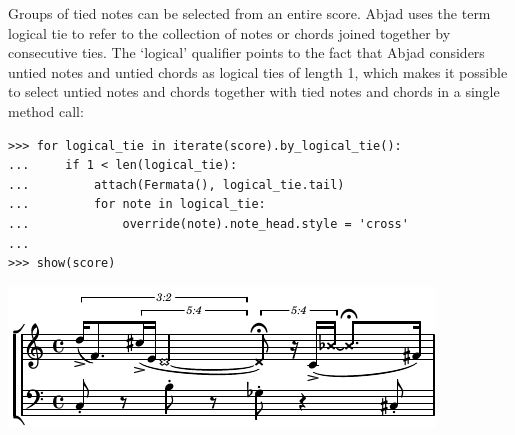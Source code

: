\documentclass{article}
\begin{document}
\noindent Groups of tied notes can be selected from an entire
score. Abjad uses the term logical tie to refer to the collection of notes or chords joined together by consecutive ties. The `logical' qualifier points to the fact that Abjad considers untied notes and untied chords as logical ties of length 1, which makes it possible to select untied notes and chords together with tied notes and chords in a single method call:

\begin{lstlisting}
>>> for logical_tie in iterate(score).by_logical_tie():
...     if 1 < len(logical_tie):
...         attach(Fermata(), logical_tie.tail)
...         for note in logical_tie:
...             override(note).note_head.style = 'cross'
...
>>> show(score)
\end{lstlisting}
\noindent\includegraphics{assets/lilypond-a692b35a07435259861a4299267be394.pdf}
\end{document}
